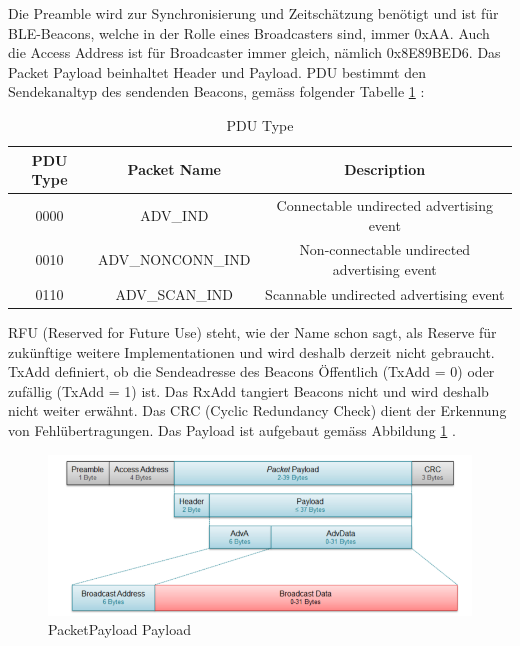 Die Preamble wird zur Synchronisierung und Zeitschätzung benötigt und ist für BLE-Beacons, welche in der Rolle eines Broadcasters sind, immer 0xAA. Auch die Access Address ist für Broadcaster immer gleich, nämlich 0x8E89BED6. Das Packet Payload beinhaltet Header und Payload. PDU bestimmt den Sendekanaltyp des sendenden Beacons, gemäss folgender Tabelle \ref{tab:PDU} \cite{9_Teildokument_BT}:\\
\begin{table}
\begin{tabular}{|c|c|c|}
\hline 
\rule[-1ex]{0pt}{2.5ex} PDU Type & Packet Name & Description \\ 
\hline 
\rule[-1ex]{0pt}{2.5ex} 0000 & ADV{\_}IND & Connectable undirected advertising event \\ 
\hline 
\rule[-1ex]{0pt}{2.5ex} 0010 & ADV{\_}NONCONN{\_}IND & Non-connectable undirected advertising event \\ 
\hline 
\rule[-1ex]{0pt}{2.5ex} 0110 & ADV{\_}SCAN{\_}IND & Scannable undirected advertising event \\ 
\hline 
\end{tabular} 
\caption[PDU Type]{PDU Type}
\label{tab:PDU}
\end{table}
RFU (Reserved for Future Use) steht, wie der Name schon sagt, als Reserve für zukünftige weitere Implementationen und wird deshalb derzeit nicht gebraucht. TxAdd definiert, ob die Sendeadresse des Beacons Öffentlich (TxAdd = 0) oder zufällig (TxAdd = 1) ist. Das RxAdd tangiert Beacons nicht und wird deshalb nicht weiter erwähnt. Das CRC (Cyclic Redundancy Check) dient der Erkennung von Fehlübertragungen. Das Payload ist aufgebaut gemäss Abbildung \ref{fig:PacketPayload_Payload} \cite{9_Teildokument_BT}.\\
\begin{figure}[H]
	\begin{center}
		\includegraphics[width=120mm]{data/PacketPayload_Payload.png}
		\caption[PacketPayload Payload]{PacketPayload Payload} %
		\label{fig:PacketPayload_Payload}
	\end{center}
\end{figure}
